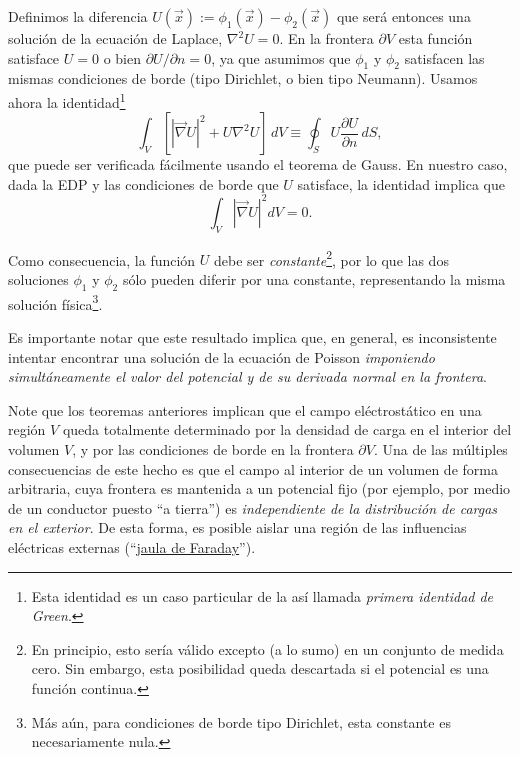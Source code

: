 Definimos la diferencia $U(\vec{x}):=\phi_1(\vec{x})-\phi_2(\vec{x})$ que será entonces una solución de la ecuación de Laplace, $\nabla^2U=0$. En la frontera $\partial V$ esta función satisface $U=0$ o bien ${\partial U}/{\partial n}=0$, ya que asumimos que $\phi_1$ y $\phi_2$ satisfacen las mismas condiciones de borde (tipo Dirichlet, o bien tipo Neumann). Usamos ahora la identidad\footnote{Esta identidad es un caso particular de la así llamada \textit{primera identidad de Green}.}
\begin{equation}
 \int_V\left[\left|\vec\nabla U\right|^2+U\nabla^2U\right]  \,dV
 \equiv\oint_SU\frac{\partial U}{\partial n}\,dS,
 \end{equation}
que puede ser verificada fácilmente usando el teorema de Gauss. En nuestro caso, dada la EDP y las condiciones de borde que $U$ satisface, la identidad implica que
\begin{equation}
 \int_V\left|\vec\nabla U\right|^2dV=0.
\end{equation}

Como consecuencia, la función $U$ debe ser \textit{constante}\footnote{En principio, esto sería válido excepto (a lo sumo) en un conjunto de medida cero. Sin embargo, esta posibilidad queda descartada si el potencial es una función continua.}, por lo que las dos soluciones $\phi_1$ y $\phi_2$ sólo pueden diferir por una constante, representando la misma solución física\footnote{Más aún, para condiciones de borde tipo Dirichlet, esta constante es necesariamente nula.}.

Es importante notar que este resultado implica que, en general, es inconsistente intentar encontrar una solución de la ecuación de Poisson \textit{imponiendo simultáneamente el valor del potencial y de su derivada normal en la frontera}.

Note que los teoremas anteriores implican que el campo eléctrostático en una región $V$ queda totalmente determinado por la densidad de carga en el interior del volumen $V$, y por las condiciones de borde en la frontera $\partial V$. Una de las múltiples consecuencias de este hecho es que el campo al interior de un volumen de forma arbitraria, cuya frontera es mantenida a un potencial fijo (por ejemplo, por medio de un conductor puesto ``a tierra'') es \textit{independiente de la distribución de cargas en el exterior}. De esta forma, es posible aislar una región de las influencias eléctricas externas (``\href{https://es.wikipedia.org/wiki/Jaula_de_Faraday}{jaula de Faraday}'').


